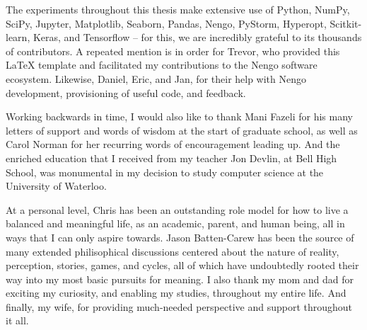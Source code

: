\newpage

The experiments throughout this thesis make extensive use of Python, NumPy, SciPy, Jupyter, Matplotlib, Seaborn, Pandas, Nengo, PyStorm, Hyperopt, Scitkit-learn, Keras, and Tensorflow -- for this, we are incredibly grateful to its thousands of contributors.
A repeated mention is in order for Trevor, who provided this \LaTeX{} template and facilitated my contributions to the Nengo software ecosystem.
Likewise, Daniel, Eric, and Jan, for their help with Nengo development, provisioning of useful code, and feedback.

Working backwards in time, I would also like to thank Mani Fazeli for his many letters of support and words of wisdom at the start of graduate school, as well as Carol Norman for her recurring words of encouragement leading up.
And the enriched education that I received from my teacher Jon Devlin, at Bell High School, was monumental in my decision to study computer science at the University of Waterloo.

At a personal level, Chris has been an outstanding role model for how to live a balanced and meaningful life, as an academic, parent, and human being, all in ways that I can only aspire towards.
Jason Batten-Carew has been the source of many extended philisophical discussions centered about the nature of reality, perception, stories, games, and cycles, all of which have undoubtedly rooted their way into my most basic pursuits for meaning.
I also thank my mom and dad for exciting my curiosity, and enabling my studies, throughout my entire life.
And finally, my wife, for providing much-needed perspective and support throughout it all.

\cleardoublepage
